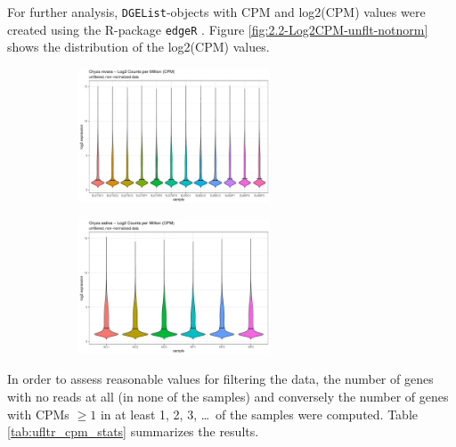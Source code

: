 For further analysis, \verb|DGEList|-objects with CPM and log2(CPM) values were created using the R-package \verb|edgeR| \autocite{R-edgeR, edgeR2010}. Figure \ref{fig:2.2-Log2CPM-unflt-notnorm} shows the distribution of the log2(CPM) values.

\begin{figure}[htbp]
    \caption{Log2(CPM) distribution of the unfiltered, non-normalized data}
    \label{fig:2.2-Log2CPM-unflt-notnorm}
    \begin{subfigure}[t]{0.64\linewidth}
        \label{fig:2.2-Log2CPM-unflt-notnorm-Oryza_nivara}
        \includegraphics[width=\textwidth, height=4cm]{../../results/plots-and-tables/2.2-Log2CPM-unflt-notnorm-Oryza_nivara}
    \end{subfigure}
    \begin{subfigure}[t]{0.32\linewidth}
        \label{fig:2.2-Log2CPM-unflt-notnorm-Oryza_sativa}
        \includegraphics[width=\textwidth, height=4cm]{../../results/plots-and-tables/2.2-Log2CPM-unflt-notnorm-Oryza_sativa}
    \end{subfigure}
\end{figure}

In order to assess reasonable values for filtering the data, the number of genes with no reads at all (in none of the samples) and conversely the number of genes with CPMs \(\ge 1\) in at least 1, 2, 3, \dots\ of the samples were computed. Table \ref{tab:ufltr_cpm_stats} summarizes the results.

